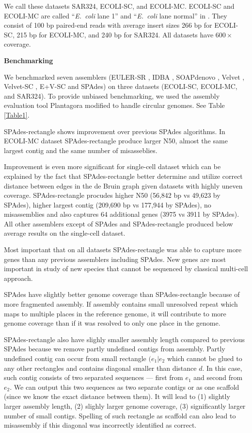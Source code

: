 \documentclass[a4paper]{article}
\def\ecoli{\emph{E.~coli}}
\def\spades{SPAdes}
\begin{document}
We call these datasets SAR324, ECOLI-SC, and ECOLI-MC.
ECOLI-SC and ECOLI-MC are called ``{\ecoli} lane 1'' and ``{\ecoli} lane normal'' in \cite{Chitsaz2011}.
They consist of 100 bp paired-end reads
with average insert sizes 266 bp for ECOLI-SC, 215 bp for ECOLI-MC,
and 240 bp for SAR324.
All datasets have $600\times$ coverage.

\textbf{Benchmarking}

We benchmarked seven assemblers
(EULER-SR \cite{Chaisson08}, IDBA \cite{Peng10}, SOAPdenovo \cite{Li10}, Velvet \cite{Zerbino08}, Velvet-SC \cite{Chitsaz2011}, E+V-SC \cite{Chitsaz2011} and {\spades}) on three datasets
(ECOLI-SC, ECOLI-MC, and SAR324). To provide unbiased
benchmarking, we used the assembly evaluation tool Plantagora \cite{Barthelson2011} modified to handle circular genomes. See Table \ref{Table1}.

{\spades}-rectangle shows improvement over previous SPAdes algorithms. In ECOLI-MC dataset {\spades}-rectangle produce larger N50, almost the same largest contig and the same number of misasseblies.

Improvement is even more significant for single-cell dataset which can be explained by the fact that {\spades}-rectangle better determine and utilize correct distance between edges in the de Bruin graph given datasets with highly uneven coverage. {\spades}-rectangle procudes higher N50 (56,842 bp vs 49,623 by {\spades}), higher largest contig (209,690 bp vs 177,944 by {\spades}), no misassemblies and also captures 64 additional genes (3975 vs 3911 by {\spades}). All other assemblers except of {\spades} and {\spades}-rectangle produced below average results on the single-cell dataset.

Most important that on all datasets {\spades}-rectangle was able to capture more genes than any previous assemblers including {\spades}. New genes are most important in study of new species that cannot be sequenced by classical multi-cell approach.

{\spades} have slightly better genome coverage than {\spades}-rectangle because of more fragmented assembly. If assembly contains small unresolved repeat which maps to multiple places in the reference genome, it will contribute to more genome coverage than if it was resolved to only one place in the genome.

{\spades}-rectangle also have slighly smaller assembly length compared to previous {\spades} because we remove partly undefined contigs from assembly. Partly undefined contig can occur from small rectangle $(e_1|e_2$ which cannot be glued to any other rectangles and contains diagonal smaller than distance $d$. In this case, such contig consists of two separated sequences --- first from $e_1$ and second from $e_2$. We can output this two sequences as two separate contigs or as one scaffold (since we know the exact distance between them). It will lead to (1) slightly larger assembly length, (2) slighly larger genome coverage, (3) significantly larger number of small contigs. Spelling of such rectangle as scaffold can also lead to misassembly if this diagonal was incorrectly identified as correct.
\end{document}
